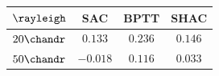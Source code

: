 \begin{tabular}{lccc}
\toprule
$\rayleigh$ & SAC & BPTT & SHAC \\
\midrule
$20\chandr$ & $0.133$ & $\mathbf{0.236}$ & $0.146$ \\
$50\chandr$ & $-0.018$ & $\mathbf{0.116}$ & $0.033$ \\
\bottomrule
\end{tabular}
